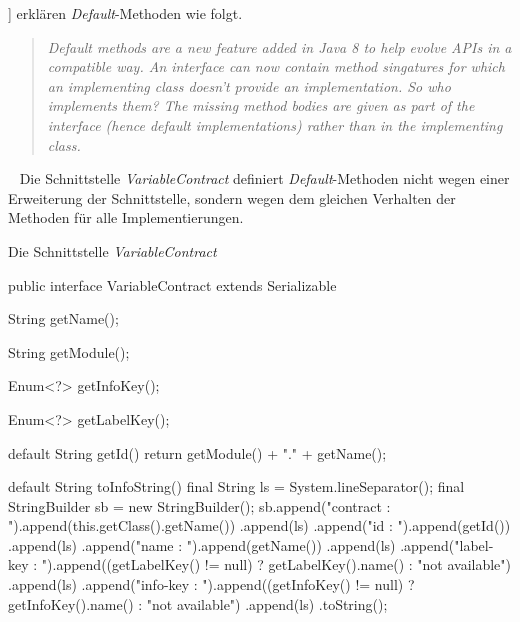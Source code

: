 \newline
\newline
[\cite[213]{java8InAction}] erklären \emph{Default}-Methoden wie folgt.
\begin{quote}
	\emph{Default methods are a new feature added in Java 8 to help evolve APIs in a compatible way. An interface can now contain method singatures for which an implementing class doesn't provide an implementation. So who implements them? The missing method bodies are given as part of the interface (hence default implementations) rather than in the implementing class. }
\end{quote}
\ \newline
Die Schnittstelle \emph{VariableContract} definiert \emph{Default}-Methoden nicht wegen einer Erweiterung der Schnittstelle, sondern wegen dem gleichen Verhalten der Methoden für alle Implementierungen.
\newpage

\begin{program}[h]
\caption{Die Schnittstelle \emph{VariableContract}}
\label{prog:variableContract}
\begin{JavaCode}
public interface VariableContract extends Serializable {

    String getName();

    String getModule();

    Enum<?> getInfoKey();

    Enum<?> getLabelKey();

    default String getId() {      
        return getModule() + "." + getName();
    }

    default String toInfoString() {
        final String        ls = System.lineSeparator();
        final StringBuilder sb = new StringBuilder();
        sb.append("contract  : ").append(this.getClass().getName())
          .append(ls)
          .append("id        : ").append(getId())
          .append(ls)
          .append("name      : ").append(getName())
          .append(ls)
          .append("label-key : ").append((getLabelKey() != null) 
                                          ? getLabelKey().name() 
                                          : "not available")
          .append(ls)
          .append("info-key  : ").append((getInfoKey() != null) 
                                          ? getInfoKey().name() 
                                          : "not available")
          .append(ls)
          .toString();
    }
    
}
\end{JavaCode}
\end{program}

